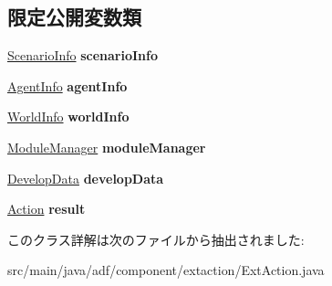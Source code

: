 \subsection*{限定公開変数類}
\begin{DoxyCompactItemize}
\item 
\hypertarget{classadf_1_1component_1_1extaction_1_1ExtAction_a6fbc25311a85d78fa3f49e9264d657b8}{}\label{classadf_1_1component_1_1extaction_1_1ExtAction_a6fbc25311a85d78fa3f49e9264d657b8} 
\hyperlink{classadf_1_1agent_1_1info_1_1ScenarioInfo}{Scenario\+Info} {\bfseries scenario\+Info}
\item 
\hypertarget{classadf_1_1component_1_1extaction_1_1ExtAction_a06db73f1d9fffdf42af9fccae0a6e2d1}{}\label{classadf_1_1component_1_1extaction_1_1ExtAction_a06db73f1d9fffdf42af9fccae0a6e2d1} 
\hyperlink{classadf_1_1agent_1_1info_1_1AgentInfo}{Agent\+Info} {\bfseries agent\+Info}
\item 
\hypertarget{classadf_1_1component_1_1extaction_1_1ExtAction_a641f11ee5304c24ffabcc452830261e7}{}\label{classadf_1_1component_1_1extaction_1_1ExtAction_a641f11ee5304c24ffabcc452830261e7} 
\hyperlink{classadf_1_1agent_1_1info_1_1WorldInfo}{World\+Info} {\bfseries world\+Info}
\item 
\hypertarget{classadf_1_1component_1_1extaction_1_1ExtAction_a9d41b6d5cf350972b6b6dd9343162cfe}{}\label{classadf_1_1component_1_1extaction_1_1ExtAction_a9d41b6d5cf350972b6b6dd9343162cfe} 
\hyperlink{classadf_1_1agent_1_1module_1_1ModuleManager}{Module\+Manager} {\bfseries module\+Manager}
\item 
\hypertarget{classadf_1_1component_1_1extaction_1_1ExtAction_a628aa58b77cb5ec94fe56f6f20f6c019}{}\label{classadf_1_1component_1_1extaction_1_1ExtAction_a628aa58b77cb5ec94fe56f6f20f6c019} 
\hyperlink{classadf_1_1agent_1_1develop_1_1DevelopData}{Develop\+Data} {\bfseries develop\+Data}
\item 
\hypertarget{classadf_1_1component_1_1extaction_1_1ExtAction_a10762c84b9058147d4e9e4813a4f6466}{}\label{classadf_1_1component_1_1extaction_1_1ExtAction_a10762c84b9058147d4e9e4813a4f6466} 
\hyperlink{classadf_1_1agent_1_1action_1_1Action}{Action} {\bfseries result}
\end{DoxyCompactItemize}


このクラス詳解は次のファイルから抽出されました\+:\begin{DoxyCompactItemize}
\item 
src/main/java/adf/component/extaction/Ext\+Action.\+java\end{DoxyCompactItemize}
